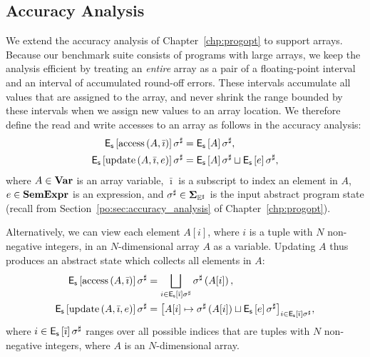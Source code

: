 \subsection{Accuracy Analysis}
\label{lo:sub:accuracy}

We extend the accuracy analysis of Chapter~\ref{chp:progopt} to support arrays.
Because our benchmark suite consists of programs with large arrays, we keep
the analysis efficient by treating an \emph{entire} array as a pair of a
floating-point interval and an interval of accumulated round-off errors.  These
intervals accumulate all values that are assigned to the array, and never
shrink the range bounded by these intervals when we assign new values to an
array location.  We therefore define the read and write accesses to an array as
follows in the accuracy analysis:
\begin{equation}
    \begin{aligned}
        \operatorname{\mathsf{E}_\mathsf{s}}\left[{\operatorname{\mathrm{access}}\left({A}, {\bar\imath}\right)}\right]\sigma^\sharp
        &= \operatorname{\mathsf{E}_\mathsf{s}}\left[{A}\right]\sigma^\sharp, \\
        \operatorname{\mathsf{E}_\mathsf{s}}\left[{\operatorname{\mathrm{update}}\left({A}, {\bar\imath}, {e}\right)}\right]\sigma^\sharp
        &= \operatorname{\mathsf{E}_\mathsf{s}}\left[{A}\right]\sigma^\sharp \sqcup
           \operatorname{\mathsf{E}_\mathsf{s}}\left[{e}\right]\sigma^\sharp,
    \end{aligned}
\end{equation}
where $A \in \mathbf{Var}$ is an array variable, $\bar\imath$ is a subscript
to index an element in $A$, $e \in \mathbf{SemExpr}$ is an expression, and
$\sigma^\sharp \in \mathbf{\Sigma}_{\mathbb{E}^\sharp}$ is the input abstract program state (recall from
Section~\ref{po:sec:accuracy_analysis} of Chapter~\ref{chp:progopt}).

Alternatively, we can view each element $A[i]$, where $i$ is a tuple with $N$
non-negative integers, in an $N$-dimensional array $A$ as a variable.  Updating
$A$ thus produces an abstract state which collects all elements in $A$:
\begin{equation}
    \begin{aligned}
        \operatorname{\mathsf{E}_\mathsf{s}}\left[{\operatorname{\mathrm{access}}\left({A}, {\bar\imath}\right)}\right]\sigma^\sharp
        &= \bigsqcup_{i \in \operatorname{\mathsf{E}_\mathsf{s}}\left[{\bar\imath}\right]\sigma^\sharp}
            \sigma^\sharp \left( A[i] \right), \\
        \operatorname{\mathsf{E}_\mathsf{s}}\left[{\operatorname{\mathrm{update}}\left({A}, {\bar\imath}, {e}\right)}\right]\sigma^\sharp
        &= {\left[
            A[i] \mapsto \sigma^\sharp \left( A[i] \right) \sqcup
                \operatorname{\mathsf{E}_\mathsf{s}}\left[{e}\right]\sigma^\sharp
        \right]}_{i \in \operatorname{\mathsf{E}_\mathsf{s}}\left[{\bar\imath}\right]\sigma^\sharp},
    \end{aligned}
\end{equation}
where $i \in \operatorname{\mathsf{E}_\mathsf{s}}\left[{\bar\imath}\right]\sigma^\sharp$ ranges over all possible
indices that are tuples with $N$ non-negative integers, where $A$ is an
$N$-dimensional array.

